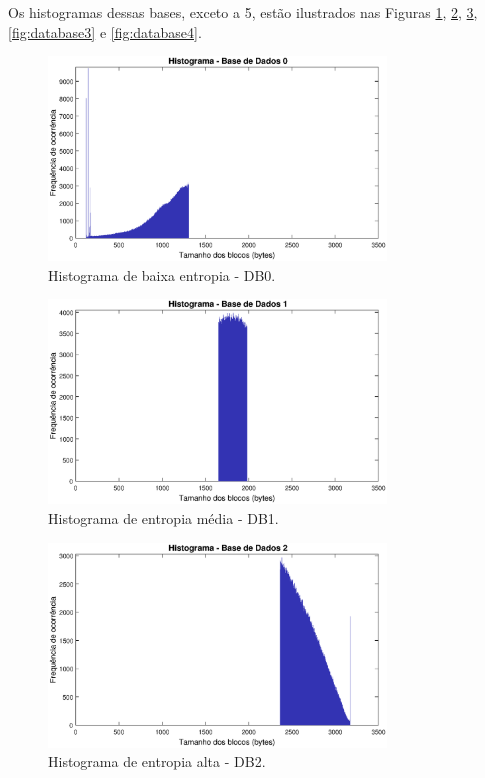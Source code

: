 
Os histogramas dessas bases, exceto a 5, estão ilustrados nas Figuras \ref{fig:database0}, \ref{fig:database1}, \ref{fig:database2}, \ref{fig:database3} e \ref{fig:database4}.

\begin{figure}
\centering
\includegraphics[width=0.8\textwidth]{figuras/hist0.eps}
\caption[Histograma de  baixa entropia -  DB0.]{Histograma de  baixa entropia -  DB0.}
\label{fig:database0}
\end{figure}

\begin{figure}
\centering
\includegraphics[width=0.80\textwidth]{figuras/hist1.eps}
\caption[Histograma de entropia média - DB1.]{Histograma de entropia média - DB1.}
\label{fig:database1}
\end{figure}

\begin{figure}
\centering
\includegraphics[width=0.8\textwidth]{figuras/hist2.eps}
\caption[Histograma de entropia alta - DB2.]{ Histograma de entropia alta - DB2.}
\label{fig:database2}
\end{figure}

